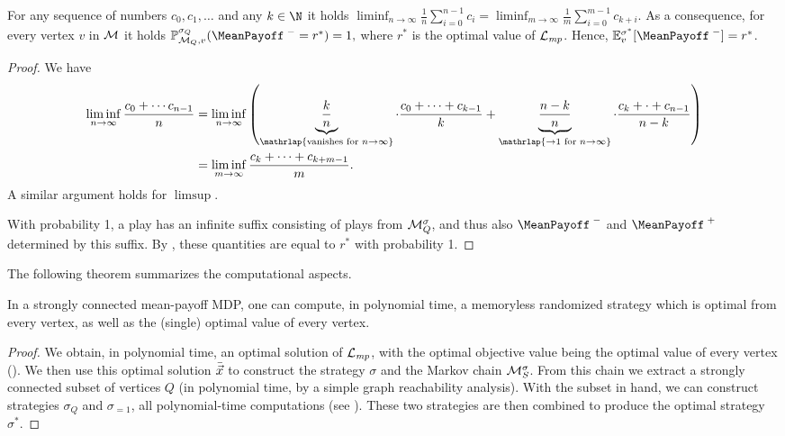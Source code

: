 \begin{theorem}
\label{5-thm:mp-valcomp} For any sequence of numbers $c_0,c_1,\dots$ and any $k\in\N$ it holds $\liminf_{n\rightarrow \infty}\frac{1}{n}\sum_{i=0}^{n-1}c_i = \liminf_{m\rightarrow \infty}\frac{1}{m}\sum_{i=0}^{m-1}c_{k+i}$. As a consequence, 
for every vertex $v$ in $\mathcal{M}$ it holds $\probm^{\sigma_Q}_{\mdp_Q,v}(\MeanPayoffInf=r^*)=1,$ where $r^*$ is the optimal value of $\mathcal{L}_{\mathit{mp}}$. Hence, $\expv^{\sigma^*}_v[\MeanPayoffInf]= r^*$.
\end{theorem}
\begin{proof}
We have
\begin{align*}
\liminf_{n\rightarrow \infty}\frac{c_0 + \cdots c_{n-1}}{n} &= \liminf_{n\rightarrow \infty}\left(\underbrace{\frac{k}{n}}_{\mathrlap{\text{vanishes for } n\rightarrow \infty}}\cdot\frac{c_0 + \cdots + c_{k-1}}{k} + \underbrace{\frac{n-k}{n}}_{\mathrlap{\rightarrow 1 \text{ for } n\rightarrow \infty}}\cdot\frac{c_k+\cdot+c_{n-1}}{n-k} \right)\\
&=\liminf_{m\rightarrow\infty} \frac{c_k+\dots+c_{k+m-1}}{m}.
\end{align*} A similar argument holds for $\limsup.$

With probability 1, a play has an infinite suffix consisting of plays from $\mathcal{M}_Q^{\sigma}$, and thus also $\MeanPayoffInf$ and $\MeanPayoffSup$ determined by this suffix. By , these quantities are equal to $r^*$ with probability 1.
\end{proof}

\noindent
The following theorem summarizes the computational aspects.

\begin{theorem}
\label{5-thm:mp-rand-opt-main}
In a strongly connected mean-payoff MDP, one can compute, in polynomial time, a memoryless randomized strategy which is optimal from every vertex, as well as the (single) optimal value of every vertex.
\end{theorem}
\begin{proof}
We obtain, in polynomial time, an optimal solution of $\mathcal{L}_{\mathit{mp}}$, with the optimal objective value being the optimal value of every vertex (). We then use this optimal solution $\bar{\vec{x}}$ to construct the strategy $\sigma$ and the  Markov chain $\mathcal{M}_{S}^{\sigma}$. From this chain we extract a strongly connected subset of vertices $Q$ (in polynomial time, by a simple graph reachability analysis). With the subset in hand, we can construct strategies $\sigma_Q$ and $\sigma_{=1}$, all polynomial-time computations (see ). These two strategies are then combined to produce the optimal strategy $\sigma^*$.
\end{proof}

